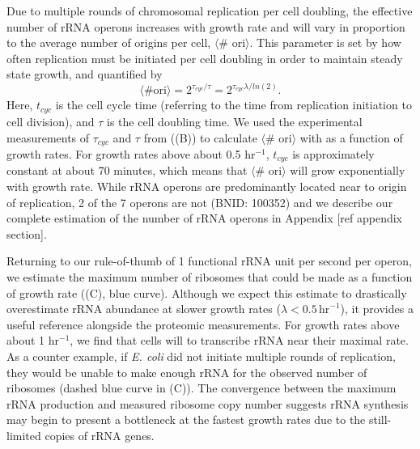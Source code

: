 Due to multiple rounds of chromosomal replication per cell doubling, the
effective number of rRNA operons increases with growth rate and will vary in
proportion to the average number of origins per cell, $\langle$\# ori$\rangle$.
This parameter is set by how often replication must be initiated per cell
doubling in order to maintain steady state growth, and quantified by
\begin{equation}
    \langle \text{\# ori} \rangle = 2^{\tau_{cyc} / \tau} = 2^{\tau_{cyc} \lambda / ln(2)}.
    \label{eq:Nori}
\end{equation}
Here, $t_{cyc}$ is the cell cycle time (referring to the time from replication
initiation to cell division), and $\tau$ is the cell doubling time.  We used the
experimental measurements of $\tau_{cyc}$ and  $\tau$ from \cite{si2017}
((B)) to calculate $\langle$\#
ori$\rangle$  with  as a function of growth rates. For growth rates
above about 0.5 hr$^{-1}$, $t_{cyc}$ is approximately  constant at about 70
minutes, which means that $\langle$\# ori$\rangle$ will  grow exponentially with
growth rate. While rRNA operons are predominantly located near to origin of
replication, 2 of the 7 operons are not (BNID: 100352) and we describe our
complete estimation of the number of rRNA operons in Appendix [ref appendix
section].

Returning to our rule-of-thumb of 1 functional rRNA unit per second per operon,
we estimate the maximum number of ribosomes that could be made as a function of
growth rate ((C), blue curve). Although we expect this
estimate to drastically overestimate rRNA abundance at slower growth rates
($\lambda < 0.5\, \text{hr}^{-1}$), it provides a useful reference alongside the
proteomic measurements. For growth rates above about 1 hr$^{-1}$, we find that
cells will  to transcribe rRNA near their maximal rate. As a counter
example, if \textit{E. coli} did not initiate multiple rounds of replication,
they would be unable to make enough rRNA for the observed number of ribosomes
(dashed blue curve in (C)). The convergence between the
maximum rRNA production and measured ribosome copy number suggests rRNA
synthesis may begin to present a bottleneck at the fastest growth rates due to
the still-limited copies of rRNA genes.



%
